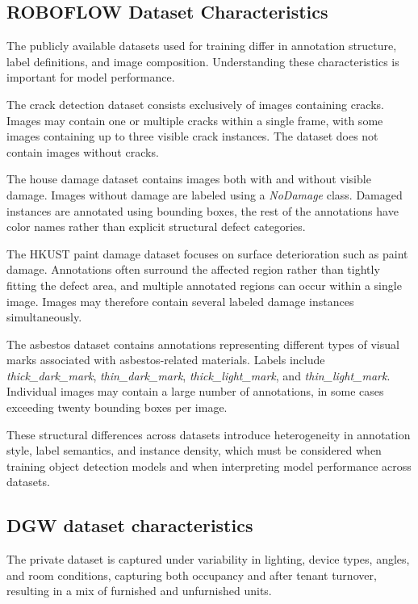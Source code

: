 \subsection{ROBOFLOW Dataset Characteristics}

The publicly available datasets used for training differ in annotation structure, label definitions, and image composition. Understanding these characteristics is important for model performance.

The crack detection dataset consists exclusively of images containing cracks. Images may contain one or multiple cracks within a single frame, with some images containing up to three visible crack instances. The dataset does not contain images without cracks.

The house damage dataset contains images both with and without visible damage. Images without damage are labeled using a \textit{NoDamage} class. Damaged instances are annotated using bounding boxes, the rest of the annotations have color names rather than explicit structural defect categories.

The HKUST paint damage dataset focuses on surface deterioration such as paint damage. Annotations often surround the affected region rather than tightly fitting the defect area, and multiple annotated regions can occur within a single image. Images may therefore contain several labeled damage instances simultaneously.

The asbestos dataset contains annotations representing different types of visual marks associated with asbestos-related materials. Labels include \textit{thick\_dark\_mark}, \textit{thin\_dark\_mark}, \textit{thick\_light\_mark}, and \textit{thin\_light\_mark}. Individual images may contain a large number of annotations, in some cases exceeding twenty bounding boxes per image.

These structural differences across datasets introduce heterogeneity in annotation style, label semantics, and instance density, which must be considered when training object detection models and when interpreting model performance across datasets.

\subsection{DGW dataset characteristics}
The private dataset is captured under variability in lighting, device types, angles, and room conditions, capturing both occupancy and after tenant turnover, resulting in a mix of furnished and unfurnished units. 


